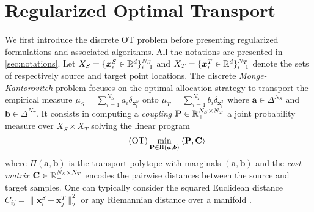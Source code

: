 \section{Regularized Optimal Transport}

We first introduce the discrete OT problem before presenting regularized formulations and associated algorithms.
All the notations are presented in \cref{sec:notations}.
Let $X_S = \{ \bm{x}_i^S \in \mathbb{R}^d \}_{i=1}^{N_S}$ and $X_T = \{ \bm{x}_i^T \in \mathbb{R}^d \}_{i=1}^{N_T}$ denote the sets of respectively source and target point locations. The discrete \emph{Monge-Kantorovitch} problem \cite{kantorovich1942transfer} focuses on the optimal allocation strategy to transport the empirical measure $\mu_S = \sum_{i=1}^{N_S} a_i  \delta_{\bm{x}_i^S}$ onto $\mu_T = \sum_{i=1}^{N_T} b_i  \delta_{\bm{x}_i^T}$ where $\bm{a} \in \Delta^{N_S}$ and $\bm{b} \in \Delta^{N_T}$. It consists in computing a \emph{coupling} ${\mathbf{P}} \in \mathbb{R}_{+}^{N_S \times N_T}$ \ie a joint probability measure over $X_S \times X_T$ solving the linear program
\begin{equation}
    \tag{OT}
    \label{eq:OT}
    \min_{{\mathbf{P}} \in \Pi(\bm{a}, \bm{b})} \: \langle {\mathbf{P}}, {\mathbf{C}} \rangle
\end{equation}
where $\Pi(\bm{a}, \bm{b})$ is the transport polytope with marginals $(\bm{a}, \bm{b})$ and the \emph{cost matrix} $\mathbf{C} \in \mathbb{R}_+^{N_S \times N_T}$ encodes the pairwise distances between the source and target samples. One can typically consider the squared Euclidean distance $C_{ij} = \|\bm{x}^S_{i}-\bm{x}^T_{j}\|_2^2$ or any Riemannian distance over a manifold \cite{villani2009optimal}.


